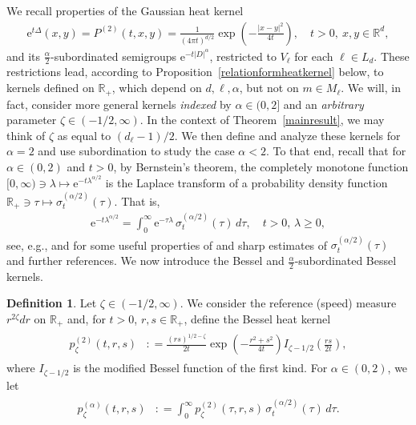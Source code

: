 \documentclass[12pt,reqno]{amsart}
\theoremstyle{definition}
\newtheorem{definition}[theorem]{Definition}
\theoremstyle{remark}
\numberwithin{equation}{section}
\newcommand{\1}{\mathbbm{1}}
\newcommand{\R}{\mathbb{R}}
\newcommand{\me}[1]{\mathrm{e}^{#1}}
\begin{document}
We recall properties of the Gaussian heat kernel
\begin{align}
  \me{t\Delta}(x,y)
  = P^{(2)}(t,x,y)
  = \frac{1}{(4\pi t)^{d/2}}\exp\left(-\frac{|x-y|^2}{4t}\right), \quad t>0,\ x,y\in\R^d,
\end{align}
and its $\frac\alpha2$-subordinated semigroups $\me{-t|D|^\alpha}$, restricted to $V_{\ell}$ for each $\ell\in L_d$. These restrictions lead, according to Proposition~\ref{relationformheatkernel} below, to kernels defined on $\R_+$, which depend on $d,\ell,\alpha$, but not on $m\in M_\ell$. We will, in fact, consider more general kernels \emph{indexed} by $\alpha\in(0,2]$ and an \emph{arbitrary} parameter $\zeta\in(-1/2,\infty)$. In the context of Theorem~\ref{mainresult}, we may think of $\zeta$ as equal to $(d_\ell-1)/2$. We then define and analyze these kernels for $\alpha=2$ and use subordination to study the case $\alpha<2$. To that end, recall that for $\alpha\in(0,2)$ and $t>0$, by Bernstein's theorem, the completely monotone function $[0,\infty)\ni\lambda\mapsto\me{-t\lambda^{\alpha/2}}$  is the Laplace transform of a probability density function $\R_+\ni\tau\mapsto\sigma_t^{(\alpha/2)}(\tau)$. That is,
\begin{align}
  \label{eq:subordination}
  \me{-t\lambda^{\alpha/2}} = \int_0^\infty \me{-\tau\lambda}\,\sigma_t^{(\alpha/2)}(\tau)\,d\tau, \quad t>0,\,\lambda\geq0,
\end{align}
see, e.g., \cite[Chapter~5]{Schillingetal2012} and \cite[Appendix~B]{BogdanMerz2024} for some useful properties of and sharp estimates of $\sigma_t^{(\alpha/2)}(\tau)$ and further references. We now introduce the Bessel and $\tfrac\alpha2$-subordinated Bessel kernels.

\begin{definition}
  \label{defsemigroupptwise}
  \label{defsemigroupptwisealpha}
  Let $\zeta\in(-1/2,\infty)$. We consider the reference (speed) measure $r^{2\zeta}dr$ on $\R_+$ and, for $t>0$, $r,s\in\R_+$, define the Bessel heat kernel
  \begin{align}
    \label{eq:defpheatalpha2}
    \begin{split}
      p_\zeta^{(2)}(t,r,s) & : = \frac{(rs)^{1/2-\zeta}}{2t}\exp\left(-\frac{r^2+s^2}{4t}\right)I_{\zeta-1/2}\left(\frac{rs}{2t}\right),
    \end{split}
  \end{align}
  where $I_{\zeta-1/2}$ is the modified Bessel function of the first kind. For $\alpha\in(0,2)$, we let
\begin{align}
    \label{eq:defpheatalpha}
    \begin{split}
      p_\zeta^{(\alpha)}(t,r,s) & : = \int_0^\infty p_\zeta^{(2)}(\tau,r,s)\,\sigma_t^{(\alpha/2)}(\tau)\,d\tau.
    \end{split}
  \end{align}  
\end{definition}
\end{document}
